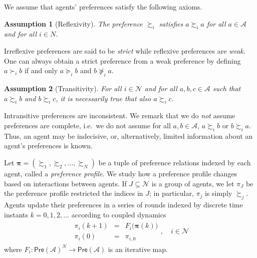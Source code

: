 \documentclass[conference]{ieeeconf}
\newcommand{\N}{\mathcal{N}}
\newcommand{\A}{\mathcal{A}}
\newcommand{\Pref}{\mathsf{Pre}}
\newcommand{\prefers}{\succsim}
\newcommand{\profile}{\boldsymbol{\pi}}
\newtheorem{assumption}{Assumption}
\begin{document}


We assume that agents' preferences satisfy the following axioms.
\begin{assumption}[Reflexivity] \label{ass:reflexivity}
    The preference $\prefers_i$ satisfies $a \prefers_i a$ for all $a \in \A$ and for all $i \in N$.
\end{assumption}

Irreflexive preferences are said to be \emph{strict} while reflexive preferences are \emph{weak}. One can always obtain a strict preference from a weak preference by defining $a \succ_i b$ if and only $a \succeq_i b$ and $b \not\succeq_i a$.

\begin{assumption}[Transitivity]\label{ass:transitivity}
    For all $i \in \N$ and for all $a, b, c \in \A$ such that $a \prefers_i b$ and $b \prefers_i c$, it is necessarily true that also $a \prefers_i c$.
\end{assumption}

Intransitive preferences are inconsistent. We remark that we do \emph{not} assume preferences are complete, i.e.~we do not assume for all $a,b \in \A$, $a \prefers_i b$ or $b \prefers_i a$. Thus, an agent may be indecisive, or, alternatively, limited information about an agent's preferences is known. 

Let $\profile = \left( \prefers_1, \prefers_2, \dots, \prefers_N \right)$ be a tuple of preference relations indexed by each agent, called a \emph{preference profile}. We study how a preference profile changes based on interactions between agents. If $J \subseteq \N$ is a group of agents, we let $\pi_{J}$ be the preference profile restricted the indices in $J$; in particular, $\pi_j$ is simply $\prefers_j$. Agents update their preferences in a series of rounds indexed by discrete time instants $k=0,1,2,\dots$ according to coupled dynamics
\begin{align}
    \begin{aligned}
        \pi_i(k+1) &=& F_i \bigl( \profile(k) \bigr)  \\
        \pi_i(0) &=& \pi_{i,0}
    \end{aligned}, \quad i \in \N
    \label{eq:pi-dynamics}
\end{align}
where $F_i: \Pref(\A)^N \to \Pref(\A)$ is an iterative map.
\end{document}
